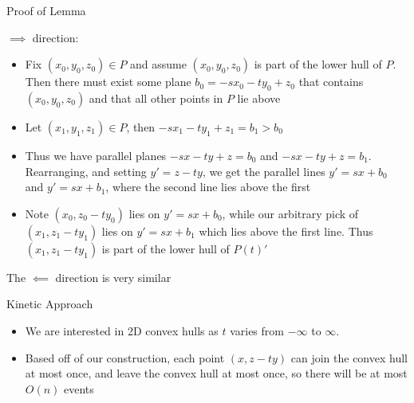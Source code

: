 \documentclass[aspectratio=169, handout]{beamer}
\begin{document}
\begin{frame}{Proof of Lemma}
    \begin{pf}
    $\implies$ direction:
        \begin{itemize}
            \item Fix $(x_0, y_0, z_0) \in P$ and assume $(x_0, y_0, z_0)$ is part of the lower hull of $P$. Then there must exist some plane $b_0 = -sx_0 - ty_0 + z_0$ that contains $(x_0, y_0, z_0)$ and that all other points in $P$ lie above
            \pause
            \item Let $(x_1, y_1, z_1) \in P$, then $-sx_1 - ty_1 + z_1 = b_1 > b_0$
            \item Thus we have parallel planes $-sx - ty + z = b_0$ and $-sx - ty + z = b_1$. Rearranging, and setting $y' = z - ty$, we get the parallel lines $y' = sx + b_0$ and $y' = sx + b_1$, where the second line lies above the first
            \pause
            \item Note $(x_0, z_0 - ty_0)$ lies on $y' = sx + b_0$, while our arbitrary pick of $(x_1, z_1 - ty_1)$ lies on $y' = sx + b_1$ which lies above the first line. Thus $(x_1, z_1 - ty_1)$ is part of the lower hull of $P(t)'$
        \end{itemize}
        The $\impliedby$ direction is very similar
    \end{pf}
\end{frame}

\begin{frame}{Kinetic Approach}
    \begin{itemize}
        \item We are interested in 2D convex hulls as $t$ varies from $-\infty$ to $\infty$.
        \item Based off of our construction, each point $(x, z - ty)$ can join the convex hull at most once, and leave the convex hull at most once, so there will be at most $O(n)$ events
    \end{itemize}
\end{frame}
\end{document}
